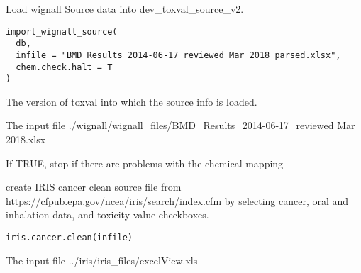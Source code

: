 \documentclass[letterpaper]{book}
\begin{document}
%
\begin{Description}\relax
Load wignall Source data into dev\_toxval\_source\_v2.
\end{Description}
%
\begin{Usage}
\begin{verbatim}
import_wignall_source(
  db,
  infile = "BMD_Results_2014-06-17_reviewed Mar 2018 parsed.xlsx",
  chem.check.halt = T
)
\end{verbatim}
\end{Usage}
%
\begin{Arguments}
\begin{ldescription}
\item[\code{db}] The version of toxval into which the source info is loaded.

\item[\code{infile}] The input file ./wignall/wignall\_files/BMD\_Results\_2014-06-17\_reviewed Mar 2018.xlsx

\item[\code{chem.check.halt}] If TRUE, stop if there are problems with the chemical mapping
\end{ldescription}
\end{Arguments}
%
\begin{Description}\relax
create IRIS cancer clean source file from https://cfpub.epa.gov/ncea/iris/search/index.cfm
by selecting cancer, oral and inhalation data, and toxicity value checkboxes.
\end{Description}
%
\begin{Usage}
\begin{verbatim}
iris.cancer.clean(infile)
\end{verbatim}
\end{Usage}
%
\begin{Arguments}
\begin{ldescription}
\item[\code{infile}] The input file ../iris/iris\_files/excelView.xls
\end{ldescription}
\end{Arguments}
\end{document}
